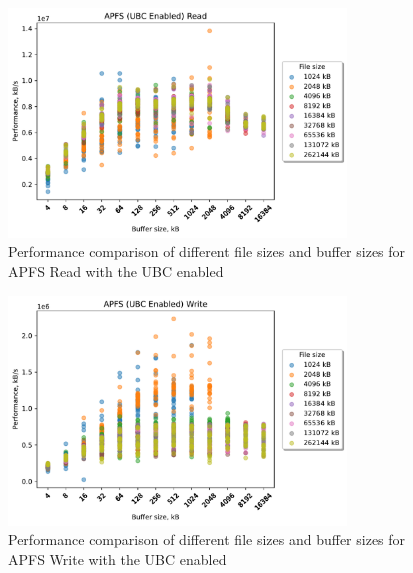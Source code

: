 \begin{figure}[!htb]
	\label{fig:bench_apfs_no_ubc_scatter_read}
	\begin{center}
		\includegraphics[width=0.8\textwidth]{figures.nosync/benchmarking/APFS/scatter-UBC Enabled-Read.pdf}
	\end{center}
	\caption[Comparison of Read performance for file size and buffer size of APFS with the UBC disabled]{Performance comparison of different file sizes and buffer sizes for APFS Read with the UBC enabled}
\end{figure}
\begin{figure}[!htb]
	\label{fig:bench_apfs_no_ubc_scatter_write}
	\begin{center}
		\includegraphics[width=0.8\textwidth]{figures.nosync/benchmarking/APFS/scatter-UBC Enabled-Write.pdf}
	\end{center}
	\caption[Comparison of Write performance for file size and buffer size of APFS with the UBC disabled]{Performance comparison of different file sizes and buffer sizes for APFS Write with the UBC enabled}
\end{figure}
\clearpage
